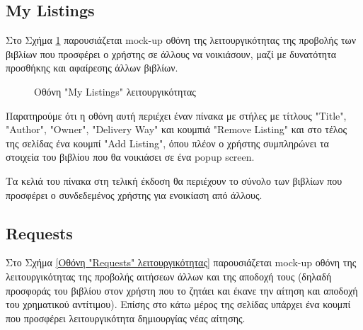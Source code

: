 \documentclass[12pt,a4paper]{article}
\begin{document}
\subsection{My Listings}

Στο Σχήμα \ref{Οθόνη "My Listings" λειτουργικότητας} παρουσιάζεται mock-up οθόνη της λειτουργικότητας της προβολής των βιβλίων που προσφέρει ο χρήστης σε άλλους να νοικιάσουν, μαζί με δυνατότητα προσθήκης και αφαίρεσης άλλων βιβλίων.

\begin{figure}[H]
	\caption{Οθόνη "My Listings" λειτουργικότητας}
	\label{Οθόνη "My Listings" λειτουργικότητας}
\end{figure}

Παρατηρούμε ότι η οθόνη αυτή περιέχει έναν πίνακα με στήλες με τίτλους "Title", "Author", "Owner", "Delivery Way" και κουμπιά "Remove Listing" και στο τέλος της σελίδας ένα κουμπί "Add Listing", όπου πλέον ο χρήστης συμπληρώνει τα στοιχεία του βιβλίου που θα νοικιάσει σε ένα popup screen.

Τα κελιά του πίνακα στη τελική έκδοση θα περιέχουν το σύνολο των βιβλίων που προσφέρει ο συνδεδεμένος χρήστης για ενοικίαση από άλλους.

\subsection{Requests}

Στο Σχήμα \ref{Οθόνη "Requests" λειτουργικότητας} παρουσιάζεται mock-up οθόνη της λειτουργικότητας της προβολής αιτήσεων άλλων και της αποδοχή τους (δηλαδή προσφοράς του βιβλίου στον χρήστη που το ζητάει και έκανε την αίτηση και αποδοχή του χρηματικού αντίτιμου). Επίσης στο κάτω μέρος της σελίδας υπάρχει ένα κουμπί που προσφέρει λειτουργικότητα δημιουργίας νέας αίτησης.
\end{document}
